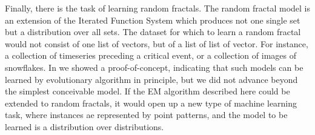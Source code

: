 \documentclass[10pt,a4paper,oneside]{article}
\theoremstyle{definition}
\begin{document}
Finally, there is the task of learning random fractals. The random fractal model is an extension of the Iterated Function System which produces not one single set but a distribution over all sets. The dataset for which to learn a random fractal would not consist of one list of vectors, but of a list of list of vector. For instance, a collection of timeseries preceding a critical event, or a collection of images of snowflakes. In \cite{bloem2010fractal} we showed a proof-of-concept, indicating that such models can be learned by evolutionary algorithm in principle, but we did not advance beyond the simplest conceivable model. If the EM algorithm described here could be extended to random fractals, it would open up a new type of machine learning task, where instances ae represented by point patterns, and the model to be learned is a distribution over distributions.  



\end{document}

